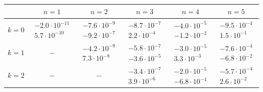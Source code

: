 \begin{table}[tbp]
\centering
\begin{tabular}{cccccc}
\hline
	& $n = 1$ & $n = 2$ & $n = 3$ & $n = 4$ & $n = 5$ \\ \hline
	$k = 0$ & $\begin{array}{c} -2.0 \cdot 10^{-11} \\ 5.7 \cdot 10^{-10} \end{array}$ & $\begin{array}{c} -7.6 \cdot 10^{-9} \\ -9.2 \cdot 10^{-7} \end{array}$ & $\begin{array}{c} -8.7 \cdot 10^{-7} \\ 2.2 \cdot 10^{-4} \end{array}$ & $\begin{array}{c} -4.0 \cdot 10^{-5} \\ -1.2 \cdot 10^{-2} \end{array}$ & $\begin{array}{c} -9.5 \cdot 10^{-4} \\ 1.5 \cdot 10^{-1} \end{array}$ \\ \hline
	$k = 1$ & $-$ & $\begin{array}{c} -4.2 \cdot 10^{-9} \\ 7.3 \cdot 10^{-8} \end{array}$ & $\begin{array}{c} -5.8 \cdot 10^{-7} \\ -3.6 \cdot 10^{-5} \end{array}$ & $\begin{array}{c} -3.0 \cdot 10^{-5} \\ 3.3 \cdot 10^{-3} \end{array}$ & $\begin{array}{c} -7.6 \cdot 10^{-4} \\ -6.8 \cdot 10^{-2} \end{array}$ \\ \hline
	$k = 2$ & $-$ & $-$ & $\begin{array}{c} -3.4 \cdot 10^{-7} \\ 3.9 \cdot 10^{-6} \end{array}$ & $\begin{array}{c} -2.0 \cdot 10^{-5} \\ -6.8 \cdot 10^{-4} \end{array}$ & $\begin{array}{c} -5.7 \cdot 10^{-4} \\ 2.6 \cdot 10^{-2} \end{array}$ \\ \hline

\end{tabular}
\end{table}
